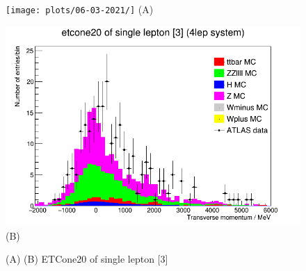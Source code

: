\begin{figure}[h!]
    \centering
    \begin{minipage}{0.5\textwidth}
        \centering
        \texttt{[image: plots/06-03-2021/]}
        (A)
    \end{minipage}\hfill
    \begin{minipage}{0.5\textwidth}
        \centering
        \includegraphics[width=\linewidth]{plots/06-03-2021/10-02_06-03-21_.png}
        (B)
    \end{minipage}
    \caption{(A)  (B) ETCone20 of single lepton [3]}
    \label{fig:10-00_}
\end{figure}

